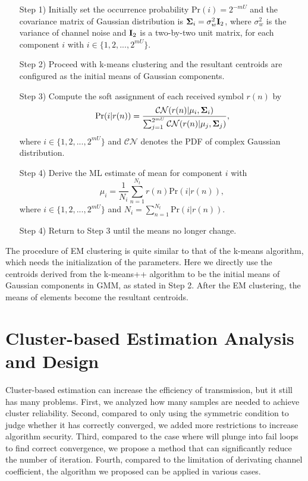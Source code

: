 \begin{enumerate}[leftmargin=\leftmargin+\widthof{Prefix}]
\item[Step 1)] Initially set the occurrence probability $\text{Pr}(i)=2^{-mU}$ and the covariance matrix of Gaussian distribution is ${\bf \Sigma}_i = \sigma_w^2 {\bf I}_2$, where $\sigma_w^2$ is the variance of channel noise and ${\bf I}_2$ is a two-by-two unit matrix, for each component $i$ with $i \in \{1, 2, ..., 2^{mU}\}$.
\item[Step 2)] Proceed with k-means clustering and the resultant centroids are configured as the initial means of Gaussian components.
\item[Step 3)] Compute the soft assignment of each received symbol $r(n)$ by
\begin{equation}
 \text{Pr}(i|r(n)) = \frac{\mathcal{CN}(r(n)|\mu_i,{\bf \Sigma}_i)}{\sum_{j=1}^{2^{mU}}\mathcal{CN}(r(n)|\mu_j,{\bf \Sigma}_j)},
\end{equation}
where $i \in \{1,2,...,2^{mU}\}$ and $\mathcal{CN}$ denotes the PDF of complex Gaussian distribution.
\item[Step 4)] Derive the ML estimate of mean for component $i$ with
\begin{equation}
 \mu_i = \frac{1}{N_i} \sum_{n=1}^{N_t} r(n)\text{Pr}(i|r(n)),
\end{equation}
where $i \in \{1, 2, ..., 2^{mU}\}$ and $N_i=\sum_{n=1}^{N_t}\text{Pr}(i|r(n))$.
\item[Step 4)] Return to Step 3 until the means no longer change.
\end{enumerate}

The procedure of EM clustering is quite similar to that of the k-means algorithm, which needs the initialization of the parameters. Here we directly use the centroids derived from the k-means++ algorithm to be the initial means of Gaussian components in GMM, as stated in Step 2. After the EM clustering, the means of elements become the resultant centroids.

\section{Cluster-based Estimation Analysis and Design}

Cluster-based estimation can increase the efficiency of transmission, but it still has many problems. First, we analyzed how many samples are needed to achieve cluster reliability. Second, compared to \cite{yt19} only using the symmetric condition to judge whether it has correctly converged, we added more restrictions to increase algorithm security. Third, compared to the case where \cite{yt19} will plunge into fail loops to find correct convergence, we propose a method that can significantly reduce the number of iteration. Fourth, compared to the limitation \cite{yt19} of derivating channel coefficient, the algorithm we proposed can be applied in various cases.

